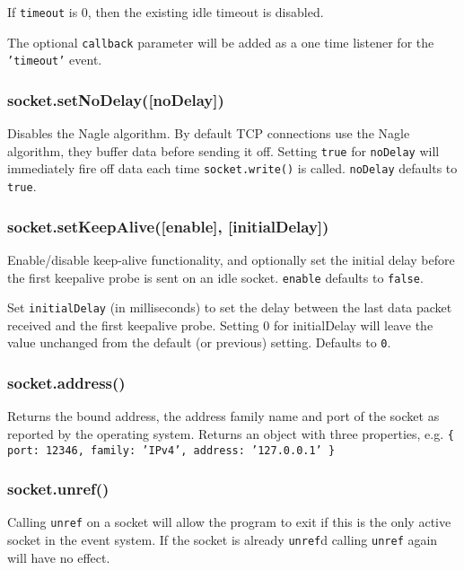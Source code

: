 If \texttt{timeout} is 0, then the existing idle timeout is disabled.

The optional \texttt{callback} parameter will be added as a one time
listener for the \texttt{'timeout'} event.

\subsubsection{socket.setNoDelay({[}noDelay{]})}\label{socket.setnodelaynodelay}

Disables the Nagle algorithm. By default TCP connections use the Nagle
algorithm, they buffer data before sending it off. Setting \texttt{true}
for \texttt{noDelay} will immediately fire off data each time
\texttt{socket.write()} is called. \texttt{noDelay} defaults to
\texttt{true}.

\subsubsection{socket.setKeepAlive({[}enable{]},
{[}initialDelay{]})}\label{socket.setkeepaliveenable-initialdelay}

Enable/disable keep-alive functionality, and optionally set the initial
delay before the first keepalive probe is sent on an idle socket.
\texttt{enable} defaults to \texttt{false}.

Set \texttt{initialDelay} (in milliseconds) to set the delay between the
last data packet received and the first keepalive probe. Setting 0 for
initialDelay will leave the value unchanged from the default (or
previous) setting. Defaults to \texttt{0}.

\subsubsection{socket.address()}\label{socket.address}

Returns the bound address, the address family name and port of the
socket as reported by the operating system. Returns an object with three
properties, e.g.
\texttt{\{ port: 12346, family: 'IPv4', address: '127.0.0.1' \}}

\subsubsection{socket.unref()}\label{socket.unref}

Calling \texttt{unref} on a socket will allow the program to exit if
this is the only active socket in the event system. If the socket is
already \texttt{unref}d calling \texttt{unref} again will have no
effect.


